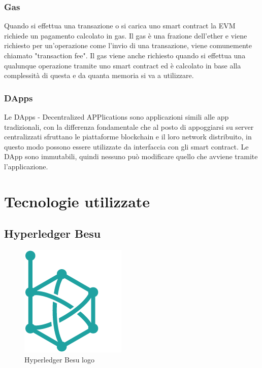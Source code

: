 \documentclass[11pt,a4paper,titlepage]{report}
\begin{document}
\subsection{Gas}
Quando si effettua una transazione o si carica uno smart contract la EVM richiede un pagamento calcolato in gas. Il gas è una frazione dell'ether e viene richiesto per un'operazione come l'invio di una transazione, viene comunemente chiamato "transaction fee". Il gas viene anche richiesto quando si effettua una qualunque operazione tramite uno smart contract ed è calcolato in base alla complessità di questa e da quanta memoria si va a utilizzare. 

\subsection{DApps}

Le DApps - Decentralized APPlications sono applicazioni simili alle app tradizionali, con la differenza fondamentale che al posto di appoggiarsi su server centralizzati sfruttano le piattaforme blockchain e il loro network distribuito, in questo modo possono essere utilizzate da interfaccia con gli smart contract. Le DApp sono immutabili, quindi nessuno può modificare quello che avviene tramite l’applicazione.

\chapter{Tecnologie utilizzate}

\section{Hyperledger Besu}
\begin{figure}
	\includegraphics[height=0.2\textheight]{Hyperledger_Besu}
	\centering
	\caption{Hyperledger Besu logo}
	\label{fig:Hyperledger_Besu_logo}
\end{figure}
\end{document}
